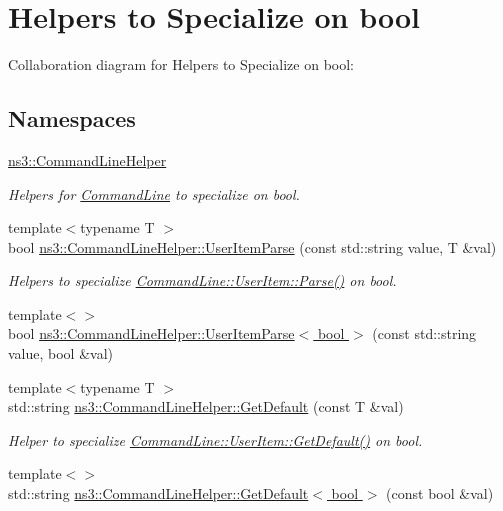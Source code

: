 \hypertarget{group__commandlinehelper}{}\section{Helpers to Specialize on bool}
\label{group__commandlinehelper}
Collaboration diagram for Helpers to Specialize on bool\+:
\subsection*{Namespaces}
\begin{DoxyCompactItemize}
\item 
 \hyperlink{namespacens3_1_1CommandLineHelper}{ns3\+::\+Command\+Line\+Helper}
\begin{DoxyCompactList}\small\item\em Helpers for \hyperlink{classns3_1_1CommandLine}{Command\+Line} to specialize on bool. \end{DoxyCompactList}\end{DoxyCompactItemize}
\begin{DoxyCompactItemize}
\item 
{\footnotesize template$<$typename T $>$ }\\bool \hyperlink{group__commandlinehelper_ga284d64fb24301f2cfdec01edbba8a6da}{ns3\+::\+Command\+Line\+Helper\+::\+User\+Item\+Parse} (const std\+::string value, T \&val)
\begin{DoxyCompactList}\small\item\em Helpers to specialize \hyperlink{classns3_1_1CommandLine_1_1UserItem_a1e35f03bcc7eea7343fcef8beec53dbb}{Command\+Line\+::\+User\+Item\+::\+Parse()} on bool. \end{DoxyCompactList}\item 
{\footnotesize template$<$$>$ }\\bool \hyperlink{group__commandlinehelper_gaab7ae136fb6933489d59fb29a9b52438}{ns3\+::\+Command\+Line\+Helper\+::\+User\+Item\+Parse$<$ bool $>$} (const std\+::string value, bool \&val)
\end{DoxyCompactItemize}
\begin{DoxyCompactItemize}
\item 
{\footnotesize template$<$typename T $>$ }\\std\+::string \hyperlink{group__commandlinehelper_ga9a8370d21f9b801cd8c631f66f0d5c39}{ns3\+::\+Command\+Line\+Helper\+::\+Get\+Default} (const T \&val)
\begin{DoxyCompactList}\small\item\em Helper to specialize \hyperlink{classns3_1_1CommandLine_1_1UserItem_a8beb0fdb64ff17d1e4717e3b4c50c573}{Command\+Line\+::\+User\+Item\+::\+Get\+Default()} on bool. \end{DoxyCompactList}\item 
{\footnotesize template$<$$>$ }\\std\+::string \hyperlink{group__commandlinehelper_gaa9a9ae90ef630d3cbfda231dcc708d3c}{ns3\+::\+Command\+Line\+Helper\+::\+Get\+Default$<$ bool $>$} (const bool \&val)
\end{DoxyCompactItemize}



